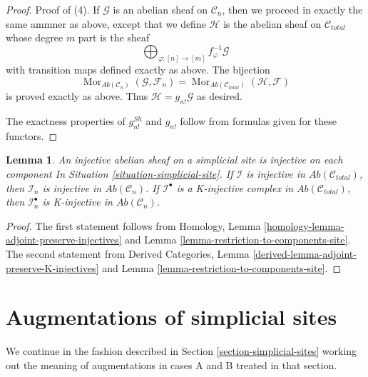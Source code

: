 \documentclass{stacks-project}
\newenvironment{slogan}{\comment}{\endcomment}
\theoremstyle{plain}
\newtheorem{lemma}[subsection]{Lemma}
\theoremstyle{definition}
\theoremstyle{remark}
\numberwithin{equation}{subsection}
\def\Mor{\mathop{\mathrm{Mor}}\nolimits}
\begin{document}
\begin{proof}
\medskip\noindent
Proof of (4). If $\mathcal{G}$ is an abelian sheaf on $\mathcal{C}_n$,
then we proceed in exactly the same ammner as above, except that
we define $\mathcal{H}$ is the abelian sheaf on $\mathcal{C}_{total}$
whose degree $m$ part is the sheaf
$$
\bigoplus\nolimits_{\varphi : [n] \to [m]} f_\varphi^{-1}\mathcal{G}
$$
with transition maps defined exactly as above. The bijection
$$
\Mor_{\textit{Ab}(\mathcal{C}_n)}(\mathcal{G}, \mathcal{F}_n) =
\Mor_{\textit{Ab}(\mathcal{C}_{total})}(\mathcal{H}, \mathcal{F})
$$
is proved exactly as above.
Thus $\mathcal{H} = g_{n!}\mathcal{G}$ as desired.

\medskip\noindent
The exactness properties of $g^{Sh}_{n!}$ and $g_{n!}$ follow
from formulas given for these functors.
\end{proof}

\begin{lemma}
\label{lemma-restriction-injective-to-component-site}
\begin{slogan}
An injective abelian sheaf on a simplicial site is injective on each component
\end{slogan}
In Situation \ref{situation-simplicial-site}.
If $\mathcal{I}$ is injective in $\textit{Ab}(\mathcal{C}_{total})$,
then $\mathcal{I}_n$ is injective in $\textit{Ab}(\mathcal{C}_n)$.
If $\mathcal{I}^\bullet$ is a K-injective complex in
$\textit{Ab}(\mathcal{C}_{total})$,
then $\mathcal{I}_n^\bullet$ is K-injective in $\textit{Ab}(\mathcal{C}_n)$.
\end{lemma}

\begin{proof}
The first statement follows from
Homology, Lemma \ref{homology-lemma-adjoint-preserve-injectives}
and
Lemma \ref{lemma-restriction-to-components-site}.
The second statement from
Derived Categories, Lemma \ref{derived-lemma-adjoint-preserve-K-injectives}
and
Lemma \ref{lemma-restriction-to-components-site}.
\end{proof}







\section{Augmentations of simplicial sites}
\label{section-augmentation-simplicial-sites}

\noindent
We continue in the fashion described in
Section \ref{section-simplicial-sites}
working out the meaning of augmentations in cases A and B
treated in that section.
\end{document}
